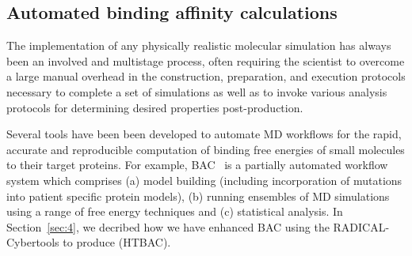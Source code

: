 \subsection{Automated binding affinity calculations}

The implementation of any physically realistic molecular simulation has
always been an involved and multistage process, often requiring the scientist
to overcome a large manual overhead in the construction, preparation, and
execution protocols necessary to complete a set of simulations as well as to
invoke various analysis protocols for determining desired properties
post-production.

Several tools have been been developed to automate MD workflows for the
rapid, accurate and reproducible computation of binding free energies of
small molecules to their target proteins. For example, BAC~\cite{Sadiq2008}
is a partially automated workflow system which comprises (a) model building
(including incorporation of mutations into patient specific protein models),
(b) running ensembles of MD simulations using a range of free energy
techniques and (c) statistical analysis. In Section~\ref{sec:4}, we decribed
how we have enhanced BAC using the RADICAL-Cybertools to produce (HTBAC).